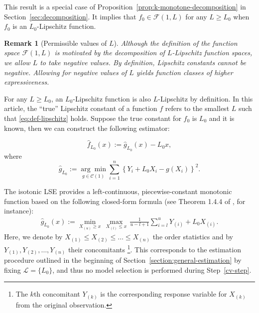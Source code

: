 \documentclass[12pt]{article}
\newtheorem{remark}{Remark}[section]
\begin{document}
This result is a special case of Proposition~\ref{prop:k-monotone-decomposition} in Section~\ref{sec:decomposition}. It implies that $f_0\in \mathcal{F}(1,L)$ for any $L \ge L_0$ when $f_0$ is an $L_0$-Lipschitz function. 

\begin{remark}[Permissible values of $L$]
    Although the definition of the function space $\mathcal{F}(1, L)$ is motivated by the decomposition of $L$-Lipschitz function spaces, we allow $L$ to take negative values. By definition, Lipschitz constants cannot be negative. Allowing for negative values of $L$ yields function classes of higher expressiveness. 
\end{remark}
For any $L \ge L_0$, an $L_0$-Lipschitz function is also $L$-Lipschitz by definition. In this article, the ``true'' Lipschitz constant of a function $f$ refers to the smallest $L$ such that \eqref{eq:def-lipschitz} holds. Suppose the true constant for $f_0$ is $L_0$ and it is known, then we can construct the following estimator:

\begin{equation}\label{eq:fixed-L-estimator}
\widehat{f}_{L_0}(x) :=\widehat{g}_{L_0}(x)-L_0 x,
\end{equation}
where
\begin{equation}\label{eq: gL_fixed_L}
\widehat{g}_{L_0} :=\underset{g \in \mathcal{C}(1)}{\arg \min } \sum_{i=1}^n\left\{Y_i + L_0 X_i - g(X_i)\right\}^2.
\end{equation}

The isotonic LSE provides a left-continuous, piecewise-constant monotonic function based on the following closed-form formula (see Theorem 1.4.4 of \cite{robertson1988order}, for instance):
\begin{align}\label{eq:max-min-formula}
	\widehat g_{L_0}(x) := \min_{X_{(u)} \ge x}\, \max_{X_{(l)}\le x} \, \frac{1}{u-l+1} \sum_{i=l}^u Y_{(i)} + L_0 X_{(i)}.
\end{align}
Here, we denote by $X_{(1)} \le X_{(2)} \le \ldots \le X_{(n)}$ the order statistics and by $Y_{(1)}, Y_{(2)}, \ldots, Y_{(n)}$ their concomitants \footnote{The $k$th concomitant $Y_{(k)}$ is the corresponding response variable for $X_{(k)}$ from the original observation.}. This corresponds to the estimation procedure outlined in the beginning of Section~\ref{section:general-estimation} by fixing $\mathcal{L} = \{L_0\}$, and thus no model selection is performed during Step~\ref{cv-step}.
\end{document}

